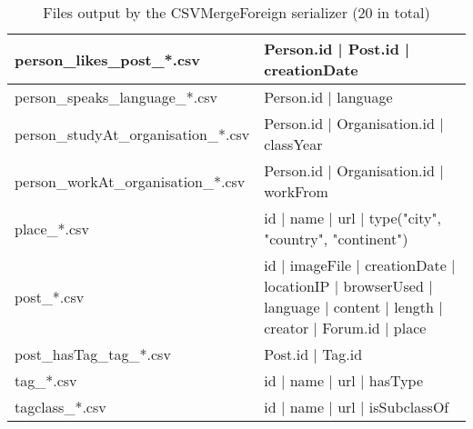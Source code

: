 \begin{table}[htb]
{\begin{tabular}{|p{4.3cm}|p{12.4cm}|}
    	person\_likes\_post\_*.csv           & Person.id | Post.id | creationDate                                                                                  \\ \hline
    	person\_speaks\_language\_*.csv      & Person.id | language                                                                                                \\ \hline
    	person\_studyAt\_organisation\_*.csv & Person.id | Organisation.id | classYear                                                                             \\ \hline
    	person\_workAt\_organisation\_*.csv  & Person.id | Organisation.id | workFrom                                                                              \\ \hline
    	place\_*.csv                         & id | name | url | type({"city", "country", "continent"})                                                            \\ \hline
    	post\_*.csv                          & id | imageFile | creationDate | locationIP | browserUsed | language | content | length | creator | Forum.id | place \\ \hline
    	post\_hasTag\_tag\_*.csv             & Post.id | Tag.id                                                                                                    \\ \hline
    	tag\_*.csv                           & id | name | url | hasType                                                                                           \\ \hline
    	tagclass\_*.csv                      & id | name | url | isSubclassOf                                                                                      \\ \hline
    \end{tabular}}
    \caption{Files output by the CSVMergeForeign serializer (20 in total)}
    \label{table:csv_merge_foreign}
\end{table}
